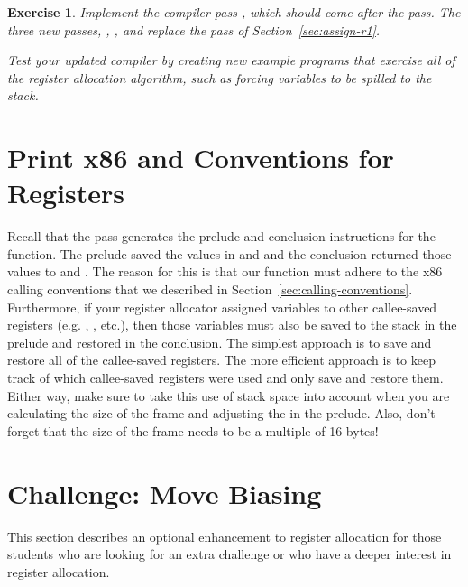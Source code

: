 \documentclass[11pt]{book}
\newtheorem{exercise}[theorem]{Exercise}
\begin{document}
\begin{exercise}\normalfont
  Implement the compiler pass , which should come
  after the  pass. The three new passes,
  , , and
   replace the  pass of
  Section~\ref{sec:assign-r1}.
  
  Test your updated compiler by creating new example programs that
  exercise all of the register allocation algorithm, such as forcing
  variables to be spilled to the stack.
\end{exercise}


\section{Print x86 and Conventions for Registers}
\label{sec:print-x86-reg-alloc}

Recall that the  pass generates the prelude and
conclusion instructions for the  function.
%
The prelude saved the values in  and  and the
conclusion returned those values to  and .  The
reason for this is that our  function must adhere to the
x86 calling conventions that we described in
Section~\ref{sec:calling-conventions}.  Furthermore, if your register
allocator assigned variables to other callee-saved registers
(e.g. , , etc.), then those variables must also be
saved to the stack in the prelude and restored in the conclusion.  The
simplest approach is to save and restore all of the callee-saved
registers. The more efficient approach is to keep track of which
callee-saved registers were used and only save and restore
them. Either way, make sure to take this use of stack space into
account when you are calculating the size of the frame and adjusting
the  in the prelude. Also, don't forget that the size of the
frame needs to be a multiple of 16 bytes!


\section{Challenge: Move Biasing}
\label{sec:move-biasing}

This section describes an optional enhancement to register allocation
for those students who are looking for an extra challenge or who have
a deeper interest in register allocation.
\end{document}
